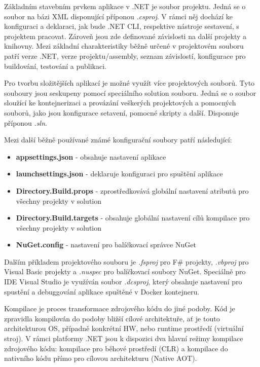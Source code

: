 
Základním stavebním prvkem aplikace v .NET je soubor projektu. Jedná se o soubor na bázi XML disponující příponou \emph{.csproj}. V rámci něj dochází ke konfiguraci a deklaraci, jak bude .NET CLI, respektive nástroje sestavení, s projektem pracovat. Zároveň jsou zde definované závislosti na další projekty a knihovny. \cite{Alls2023} Mezi základní charakteristiky běžně určené v projektovém souboru patří verze .NET, verze projektu/assembly, seznam závislostí, konfigurace pro buildování, testování a publikaci.

Pro tvorbu složitějších aplikací je možné využít více projektových souborů. Tyto souboury jsou seskupeny pomocí speciálního solution souboru. Jedná se o soubor sloužící ke kontejnerizaci a provázání veškerých projektových a pomocných souborů, jako jsou konfigurace setavení, pomocné skripty a další. Disponuje příponou \emph{.sln}.

Mezi další běžně používané známé konfigurační soubory patří následující:

\begin{itemize}
    \item \textbf{appsettings.json} - obsahuje nastavení aplikace
    \item \textbf{launchsettings.json} - deklaruje konfiguraci pro spuštění aplikace
    \item \textbf{Directory.Build.props} - zprostředkovává globální nastavení atributů pro všechny projekty v solution
    \item \textbf{Directory.Build.targets} - obsahuje globální nastavení cílů kompilace pro všechny projekty v solution
    \item \textbf{NuGet.config} - nastavení pro balíčkovací správce NuGet
\end{itemize}

Dalším příkladem projektového souboru je \emph{.fsproj} pro F\# projekty, \emph{.vbproj} pro Visual Basic projekty a \emph{.nuspec} pro balíčkovací soubory NuGet. Speciálně pro IDE Visual Studio je využíván soubor \emph{.dcsproj}, který obsahuje nastavení pro spustění a debuggování aplikace spuštěné v Docker kontejneru. 


Kompilace je proces transformace zdrojového kódu do jiné podoby. Kód je zpravidla kompilován do podoby bližší cílové architektuře, ať je touto architekturou OS, případně konkrétní HW, nebo runtime prostředí (virtuální stroj). \cite{Richter2012} V rámci platformy .NET jsou k dispozici dva hlavní režimy kompilace zdrojového kódu: kompilace pro běhové prostředí (CLR) a kompilace do nativního kódu přímo pro cílovou architekturu (Native AOT). \cite{Bock2016}

